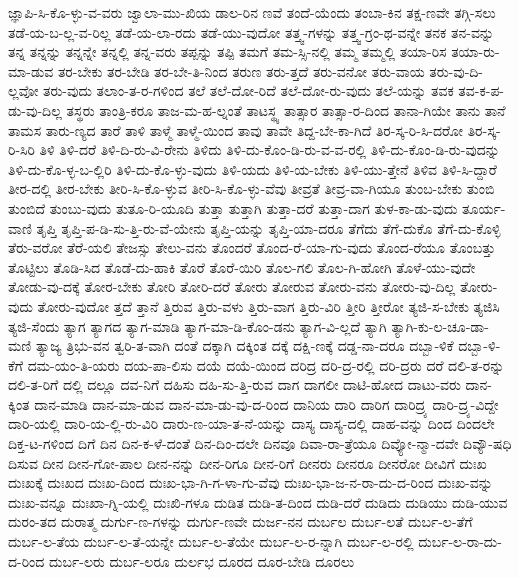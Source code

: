 {ಜ್ಞಾಪಿ-ಸಿ-ಕೊ-ಳ್ಳು-ವ-ವರು
ಜ್ವಾಲಾ-ಮು-ಖಿಯ
ಡಾಲ-ರಿನ
ಣವೆ
ತಂದೆ-ಯೆಂದು
ತಂಬಾ-ಕಿನ
ತಕ್ಷ-ಣವೇ
ತಗ್ಗಿ-ಸಲು
ತಡೆ-ಯ-ಬ-ಲ್ಲ-ವ-ರಿಲ್ಲ
ತಡೆ-ಯ-ಲಾ-ರದು
ತಡೆ-ಯು-ವುದೋ
ತತ್ತ್ವ-ಗಳನ್ನು
ತತ್ತ್ವ-ಗ್ರಂ-ಥ-ವನ್ನೇ
ತನಕ
ತನ-ವನ್ನು
ತನ್ನ
ತನ್ನನ್ನು
ತನ್ನನ್ನೇ
ತನ್ನಲ್ಲಿ
ತನ್ನ-ವರು
ತಪ್ಪನ್ನು
ತಪ್ಪಿ
ತಮಗೆ
ತಮ-ಸ್ಸಿ-ನಲ್ಲಿ
ತಮ್ಮ
ತಮ್ಮಲ್ಲಿ
ತಯಾ-ರಿಸ
ತಯಾ-ರು-ಮಾ-ಡುವ
ತರ-ಬೇಕು
ತರ-ಬೇಡಿ
ತರ-ಬೇ-ತಿ-ನಿಂದ
ತರುಣ
ತರು-ತ್ತದೆ
ತರು-ವನೋ
ತರು-ವಾಯ
ತರು-ವು-ದಿ-ಲ್ಲವೋ
ತರು-ವುದು
ತಲಾಂ-ತ-ರ-ಗಳಿಂದ
ತಲೆ
ತಲೆ-ದೋ-ರಿದೆ
ತಲೆ-ದೋ-ರು-ವುದು
ತಲೆ-ಯನ್ನು
ತವಕ
ತವ-ಕ-ಪ-ಡು-ವು-ದಿಲ್ಲ
ತಸ್ಥರು
ತಾಂತ್ರಿ-ಕರೂ
ತಾಜ-ಮ-ಹ-ಲ್ನಂತೆ
ತಾಟಸ್ಥ್ಯ
ತಾತ್ಸಾರ
ತಾತ್ಸಾ-ರ-ದಿಂದ
ತಾನಾ-ಗಿಯೇ
ತಾನು
ತಾನೆ
ತಾಮಸ
ತಾರು-ಣ್ಯದ
ತಾರೆ
ತಾಳಿ
ತಾಳ್ಮೆ
ತಾಳ್ಮೆ-ಯಿಂದ
ತಾವು
ತಾವೇ
ತಿದ್ದ-ಬೇ-ಕಾ-ಗಿದೆ
ತಿರ-ಸ್ಕ-ರಿ-ಸಿ-ದರೋ
ತಿರ-ಸ್ಕ-ರಿ-ಸಿರಿ
ತಿಳಿ
ತಿಳಿ-ದರೆ
ತಿಳಿ-ದಿ-ರು-ವಿ-ರೇನು
ತಿಳಿದು
ತಿಳಿ-ದು-ಕೊಂ-ಡಿ-ರು-ವ-ವ-ರಲ್ಲಿ
ತಿಳಿ-ದು-ಕೊಂ-ಡಿ-ರು-ವುದನ್ನು
ತಿಳಿ-ದು-ಕೊ-ಳ್ಳ-ಬ-ಲ್ಲಿರಿ
ತಿಳಿ-ದು-ಕೊ-ಳ್ಳು-ವುದು
ತಿಳಿ-ಯದು
ತಿಳಿ-ಯ-ಬೇಕು
ತಿಳಿ-ಯು-ತ್ತೇನೆ
ತಿಳಿವ
ತಿಳಿ-ಸಿ-ದ್ದಾರೆ
ತೀರ-ದಲ್ಲಿ
ತೀರ-ಬೇಕು
ತೀರಿ-ಸಿ-ಕೊ-ಳ್ಳುವ
ತೀರಿ-ಸಿ-ಕೊ-ಳ್ಳು-ವೆವು
ತೀವ್ರತೆ
ತೀವ್ರ-ವಾ-ಗಿಯೂ
ತುಂಬ-ಬೇಕು
ತುಂಬಿ
ತುಂಬಿದೆ
ತುಂಬು-ವುದು
ತುತೂ-ರಿ-ಯೂದಿ
ತುತ್ತಾ
ತುತ್ತಾಗಿ
ತುತ್ತಾ-ದರೆ
ತುತ್ತಾ-ದಾಗ
ತುಳ-ಕಾ-ಡು-ವುದು
ತೂರ್ಯ-ವಾಣಿ
ತೃಪ್ತಿ
ತೃಪ್ತಿ-ಪ-ಡಿ-ಸು-ತ್ತಿ-ರು-ವೆ-ಯೇನು
ತೃಪ್ತಿ-ಯನ್ನು
ತೃಪ್ತಿ-ಯಾ-ದರೂ
ತೆಗೆದು
ತೆಗೆ-ದುಕೊ
ತೆಗೆ-ದು-ಕೊಳ್ಳಿ
ತೆರು-ವರೋ
ತೆರೆ-ಯಲಿ
ತೇಜಸ್ಸು
ತೇಲು-ವನು
ತೊಂದರೆ
ತೊಂದ-ರೆ-ಯಾ-ಗು-ವುದು
ತೊಂದ-ರೆಯೂ
ತೊಂಬತ್ತು
ತೊಟ್ಟಿಲು
ತೊಡಿ-ಸಿದ
ತೊಡೆ-ದು-ಹಾಕಿ
ತೊರೆ
ತೊರೆ-ಯಿರಿ
ತೊಲ-ಗಲಿ
ತೊಲ-ಗಿ-ಹೋಗಿ
ತೊಳೆ-ಯು-ವುದೇ
ತೋಡು-ವು-ದಕ್ಕೆ
ತೋರ-ಬೇಕು
ತೋರಿ
ತೋರಿ-ದರೆ
ತೋರು
ತೋರುವ
ತೋರು-ವನು
ತೋರು-ವು-ದಿಲ್ಲ
ತೋರು-ವುದು
ತೋರು-ವುದೋ
ತ್ತದೆ
ತ್ತಾನೆ
ತ್ತಿರುವ
ತ್ತಿರು-ವಳು
ತ್ತಿರು-ವಾಗ
ತ್ತಿರು-ವಿರಿ
ತ್ತೀರಿ
ತ್ತೀರೋ
ತ್ಯಜಿ-ಸ-ಬೇಕು
ತ್ಯಜಿಸಿ
ತ್ಯಜಿ-ಸೆಂದು
ತ್ಯಾಗ
ತ್ಯಾಗದ
ತ್ಯಾಗ-ಮಾಡಿ
ತ್ಯಾಗ-ಮಾ-ಡಿ-ಕೊಂ-ಡನು
ತ್ಯಾಗ-ವಿ-ಲ್ಲದೆ
ತ್ಯಾಗಿ
ತ್ಯಾಗಿ-ಕು-ಲ-ಚೂ-ಡಾ-ಮಣಿ
ತ್ಯಾಜ್ಯ
ತ್ರಿಭು-ವನ
ತ್ವರಿ-ತ-ವಾಗಿ
ದಂತೆ
ದಕ್ಕಾಗಿ
ದಕ್ಕಿಂತ
ದಕ್ಕೆ
ದಕ್ಷಿ-ಣಕ್ಕೆ
ದಡ್ಡ-ನಾ-ದರೂ
ದಬ್ಬಾ-ಳಿಕೆ
ದಬ್ಬಾ-ಳಿ-ಕೆಗೆ
ದಮ-ಯಂ-ತಿ-ಯರು
ದಯ-ಪಾ-ಲಿಸು
ದಯೆ
ದಯೆ-ಯಿಂದ
ದರಿದ್ರ
ದರಿ-ದ್ರ-ರಲ್ಲಿ
ದರಿ-ದ್ರರು
ದರೆ
ದಲಿ-ತ-ರನ್ನು
ದಲಿ-ತ-ರಿಗೆ
ದಲ್ಲಿ
ದಲ್ಲೂ
ದವ-ನಿಗೆ
ದಹಿಸು
ದಹಿ-ಸು-ತ್ತಿ-ರುವ
ದಾಗ
ದಾಗಲೀ
ದಾಟಿ-ಹೋದ
ದಾಟು-ವರು
ದಾನ-ಕ್ಕಿಂತ
ದಾನ-ಮಾಡಿ
ದಾನ-ಮಾ-ಡುವ
ದಾನ-ಮಾ-ಡು-ವು-ದ-ರಿಂದ
ದಾನಿಯ
ದಾರಿ
ದಾರಿಗ
ದಾರಿದ್ರ್ಯ
ದಾರಿ-ದ್ರ್ಯ-ವಿದ್ದೇ
ದಾರಿ-ಯಲ್ಲಿ
ದಾರಿ-ಯ-ಲ್ಲಿ-ರು-ವಿರಿ
ದಾರು-ಣ-ಯಾ-ತ-ನೆ-ಯನ್ನು
ದಾಸ್ಯ
ದಾಸ್ಯ-ದಲ್ಲಿ
ದಾಹ-ವನ್ನು
ದಿಂದ
ದಿಂದಲೇ
ದಿಕ್ತ-ಟ-ಗಳಿಂದ
ದಿಗೆ
ದಿನ
ದಿನ-ಕ-ಳೆ-ದಂತೆ
ದಿನ-ದಿಂ-ದಲೇ
ದಿನವೂ
ದಿವಾ-ರಾ-ತ್ರೆಯೂ
ದಿವ್ಯೋ-ನ್ಮಾ-ದವೇ
ದಿವ್ಯೌ-ಷಧಿ
ದಿಸುವ
ದೀನ
ದೀನ-ಗೋ-ಪಾಲ
ದೀನ-ನನ್ನು
ದೀನ-ರಿಗೂ
ದೀನ-ರಿಗೆ
ದೀನರು
ದೀನರೂ
ದೀನರೋ
ದೀವಿಗೆ
ದುಃಖ
ದುಃಖಕ್ಕೆ
ದುಃಖದ
ದುಃಖ-ದಿಂದ
ದುಃಖ-ಭಾ-ಗಿ-ಗ-ಳಾ-ಗು-ವೆವು
ದುಃಖ-ಭಾ-ಜ-ನ-ರಾ-ದು-ದ-ರಿಂದ
ದುಃಖ-ವನ್ನು
ದುಃಖ-ವನ್ನೂ
ದುಃಖಾ-ಗ್ನಿ-ಯಲ್ಲಿ
ದುಃಖಿ-ಗಳೂ
ದುಡಿತ
ದುಡಿ-ತ-ದಿಂದ
ದುಡಿ-ದರೆ
ದುಡಿದು
ದುಡಿಯು
ದುಡಿ-ಯುವ
ದುರಂ-ತದ
ದುರಾತ್ಮ
ದುರ್ಗು-ಣ-ಗಳನ್ನು
ದುರ್ಗು-ಣವೇ
ದುರ್ಜ-ನನ
ದುರ್ಬಲ
ದುರ್ಬ-ಲತೆ
ದುರ್ಬ-ಲ-ತೆಗೆ
ದುರ್ಬ-ಲ-ತೆಯ
ದುರ್ಬ-ಲ-ತೆ-ಯನ್ನೇ
ದುರ್ಬ-ಲ-ತೆಯೇ
ದುರ್ಬ-ಲ-ರ-ನ್ನಾಗಿ
ದುರ್ಬ-ಲ-ರಲ್ಲಿ
ದುರ್ಬ-ಲ-ರಾ-ದು-ದ-ರಿಂದ
ದುರ್ಬ-ಲರು
ದುರ್ಬ-ಲರೂ
ದುರ್ಲಭ
ದೂರದ
ದೂರ-ಬೇಡಿ
ದೂರಲು
}
